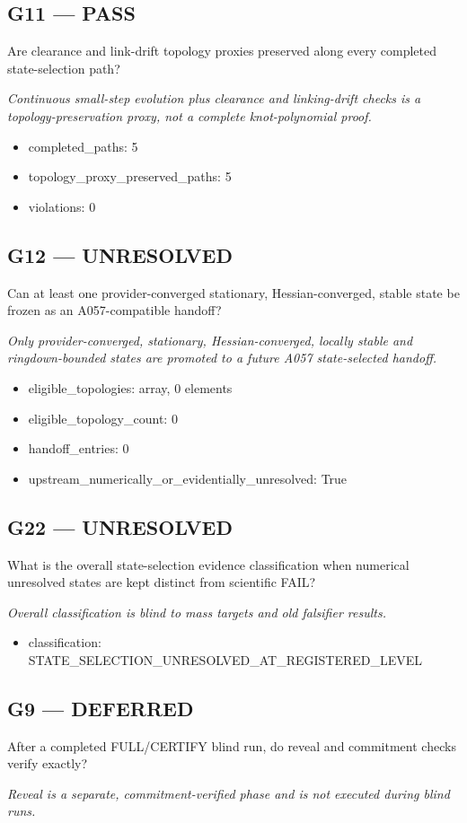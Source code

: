 \documentclass[10pt,a4paper]{article}
\begin{document}
\subsection*{G11 --- PASS}
Are clearance and link-drift topology proxies preserved along every completed state-selection path?
\par\textit{Continuous small-step evolution plus clearance and linking-drift checks is a topology-preservation proxy, not a complete knot-polynomial proof.}\par
\begin{itemize}
\item completed\_paths: 5
\item topology\_proxy\_preserved\_paths: 5
\item violations: 0
\end{itemize}
\subsection*{G12 --- UNRESOLVED}
Can at least one provider-converged stationary, Hessian-converged, stable state be frozen as an A057-compatible handoff?
\par\textit{Only provider-converged, stationary, Hessian-converged, locally stable and ringdown-bounded states are promoted to a future A057 state-selected handoff.}\par
\begin{itemize}
\item eligible\_topologies: array, 0 elements
\item eligible\_topology\_count: 0
\item handoff\_entries: 0
\item upstream\_numerically\_or\_evidentially\_unresolved: True
\end{itemize}
\subsection*{G22 --- UNRESOLVED}
What is the overall state-selection evidence classification when numerical unresolved states are kept distinct from scientific FAIL?
\par\textit{Overall classification is blind to mass targets and old falsifier results.}\par
\begin{itemize}
\item classification: STATE\_SELECTION\_UNRESOLVED\_AT\_REGISTERED\_LEVEL
\end{itemize}
\subsection*{G9 --- DEFERRED}
After a completed FULL/CERTIFY blind run, do reveal and commitment checks verify exactly?
\par\textit{Reveal is a separate, commitment-verified phase and is not executed during blind runs.}\par
\end{document}
